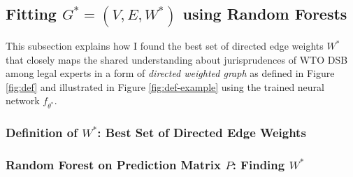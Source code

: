 \documentclass[12pt,letterpaper]{article}
\begin{document}



\subsection{Fitting $G^* = (V, E, W^*)$ using Random Forests}
This subsection explains how I found the best set of directed edge weights $W^*$ that closely maps the shared understanding about jurisprudences of WTO DSB among legal experts in a form of \textit{directed weighted graph} as defined in Figure \ref{fig:def} and illustrated in Figure \ref{fig:def-example} using the trained neural network $f_{\theta^*}$.

\subsubsection{Definition of $W^*$: Best Set of Directed Edge Weights} %

\subsubsection{Random Forest on Prediction Matrix $P$: Finding $W^*$}\label{subsec:rf}


\end{document}
